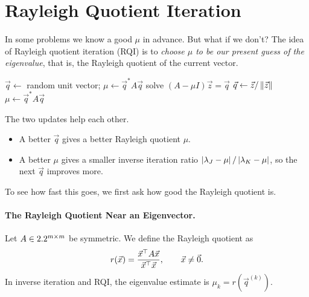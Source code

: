 \clearpage
\section{Rayleigh Quotient Iteration}

In some problems we know a good $\mu$ in advance. But what if we don't? The idea of Rayleigh quotient iteration (RQI) is to \emph{choose $\mu$ to be our present guess of the eigenvalue}, that is, the Rayleigh quotient of the current vector.

\begin{algorithm}[H]
  \caption{Rayleigh quotient iteration.}
  \label{alg:rqi}
  \begin{algorithmic}[1]
    \State $\vec{q} \gets$ random unit vector; $\mu \gets \vec{q}^\ast A\vec{q}$
      \State solve $(A - \mu I)\vec{z} = \vec{q}$
      \State $\vec{q} \gets \vec{z}/\left\lVert \vec{z} \right\rVert$
      \State $\mu \gets \vec{q}^\ast A\vec{q}$
    \EndFor
  \end{algorithmic}
\end{algorithm}

The two updates help each other.
\begin{itemize}
  \item A better $\vec{q}$ gives a better Rayleigh quotient $\mu$.
  \item A better $\mu$ gives a smaller inverse iteration ratio $\left\lvert \lambda_J - \mu \right\rvert/\left\lvert \lambda_K - \mu \right\rvert$, so the next $\vec{q}$ improves more.
\end{itemize}
To see how fast this goes, we first ask how good the Rayleigh quotient is.

\paragraph{The Rayleigh Quotient Near an Eigenvector.}

Let $A \in 2.2^{m \times m}$ be symmetric. We define the Rayleigh quotient as
\begin{equation*}
  r(\vec{x}) = \frac{\vec{x}^\top A\vec{x}}{\vec{x}^\top\vec{x}}, \qquad \vec{x} \ne \vec{0}.
\end{equation*}
In inverse iteration and RQI, the eigenvalue estimate is $\mu_k = r(\vec{q}^{(k)})$.

